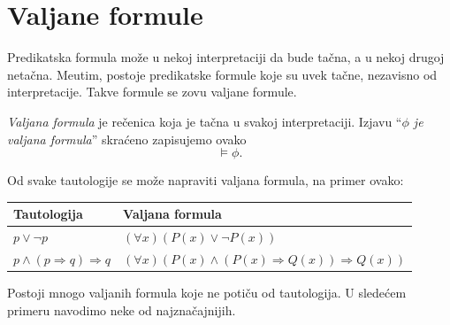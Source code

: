 \section{Valjane formule}

Predikatska formula mo\v ze u nekoj interpretaciji da bude ta\v cna, a u nekoj drugoj neta\v cna. Me\dj utim,
postoje predikatske formule koje su uvek ta\v cne, nezavisno od interpretacije.
Takve formule se zovu valjane formule.

\begin{DEF}
  \emph{Valjana formula} je re\v cenica koja je ta\v cna u svakoj interpretaciji.
  Izjavu \enquote{\textit{$\phi$ je valjana formula}} skra\'ceno zapisujemo ovako
  $$
    \vDash \phi.
  $$
\end{DEF}

\begin{EX}
  Od svake tautologije se mo\v ze napraviti valjana formula, na primer ovako:
  
  \medskip
  
  \begin{tabular}{ll}
    \hline
    Tautologija & Valjana formula\\
    \hline
    $p \lor \lnot p$ & $(\forall x)(P(x) \lor \lnot P(x))$\\
    $p \land (p \Rightarrow q) \Rightarrow q$ & $(\forall x)(P(x) \land (P(x) \Rightarrow Q(x)) \Rightarrow Q(x))$
  \end{tabular}
\end{EX}

Postoji mnogo valjanih formula koje ne poti\v cu od tautologija. U slede\'cem primeru
navodimo neke od najzna\v cajnijih.

